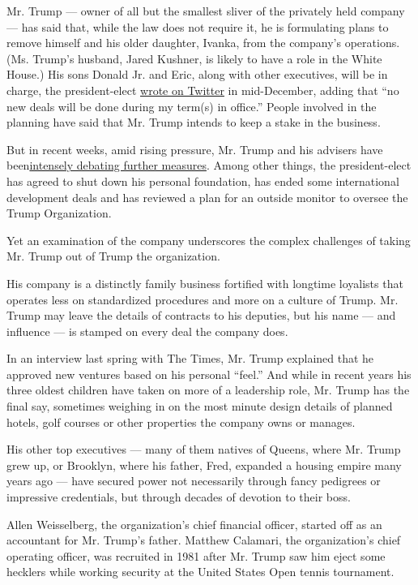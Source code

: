 Mr. Trump --- owner of all but the smallest sliver of the privately held
company --- has said that, while the law does not require it, he is
formulating plans to remove himself and his older daughter, Ivanka, from
the company's operations. (Ms. Trump's husband, Jared Kushner, is likely
to have a role in the White House.) His sons Donald Jr. and Eric, along
with other executives, will be in charge, the president-elect
\href{https://twitter.com/realDonaldTrump/status/808529888630239232}{wrote
on Twitter} in mid-December, adding that ``no new deals will be done
during my term(s) in office.'' People involved in the planning have said
that Mr. Trump intends to keep a stake in the business.

But in recent weeks, amid rising pressure, Mr. Trump and his advisers
have
been\href{https://www.nytimes.com/2016/12/24/us/politics/trump-family-conflicts.html}{intensely
debating further measures}. Among other things, the president-elect has
agreed to shut down his personal foundation, has ended some
international development deals and has reviewed a plan for an outside
monitor to oversee the Trump Organization.

Yet an examination of the company underscores the complex challenges of
taking Mr. Trump out of Trump the organization.

His company is a distinctly family business fortified with longtime
loyalists that operates less on standardized procedures and more on a
culture of Trump. Mr. Trump may leave the details of contracts to his
deputies, but his name --- and influence --- is stamped on every deal
the company does.

In an interview last spring with The Times, Mr. Trump explained that he
approved new ventures based on his personal ``feel.'' And while in
recent years his three oldest children have taken on more of a
leadership role, Mr. Trump has the final say, sometimes weighing in on
the most minute design details of planned hotels, golf courses or other
properties the company owns or manages.

His other top executives --- many of them natives of Queens, where Mr.
Trump grew up, or Brooklyn, where his father, Fred, expanded a housing
empire many years ago --- have secured power not necessarily through
fancy pedigrees or impressive credentials, but through decades of
devotion to their boss.

Allen Weisselberg, the organization's chief financial officer, started
off as an accountant for Mr. Trump's father. Matthew Calamari, the
organization's chief operating officer, was recruited in 1981 after Mr.
Trump saw him eject some hecklers while working security at the United
States Open tennis tournament.

